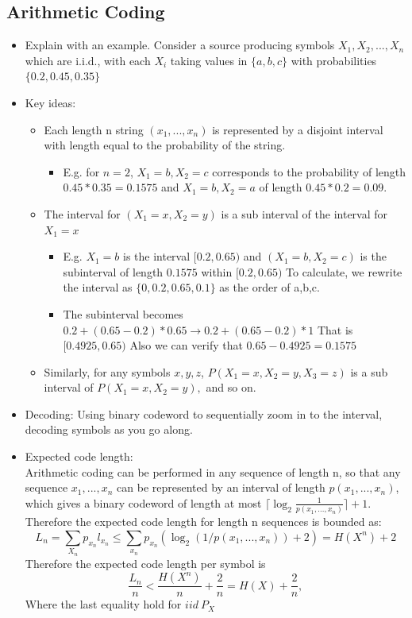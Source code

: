 \documentclass[12pt]{article}
\begin{document}
\subsection{Arithmetic Coding}
\begin{itemize}

\item Explain with an example. Consider a source producing symbols $X_1,X_2,...,X_n$ which are i.i.d., with each $X_i$ taking values in $\{a,b,c\}$ with probabilities $\{0.2,0.45,0.35\}$
\item Key ideas:
\begin{itemize}
\item Each length n string $(x_1,...,x_n)$ is represented by a disjoint interval with length equal to the probability of the string. 
\begin{itemize}
\item E.g. for $n=2$, $X_1=b,X_2=c$ corresponds to the probability of length $0.45 * 0.35=0.1575$ and $X_1=b,X_2=a$ of length $0.45 * 0.2=0.09$.
\end{itemize}
\item The interval for $(X_1=x,X_2=y)$ is a sub interval of the interval for $X_1=x$ 
\begin{itemize}
\item E.g. $X_1 = b$ is the interval $[0.2,0.65)$ and $(X_1 = b, X_2=c)$ is the subinterval of length $0.1575$ within  $[0.2,0.65)$ To calculate, we rewrite the interval as $\{0,0.2,0.65,0.1\}$ as the order of a,b,c.
\item The subinterval becomes $0.2 + (0.65-0.2) * 0.65 \rightarrow 0.2 + (0.65-0.2) * 1$ That is $[0.4925,0.65)$ Also we can verify that $0.65 - 0.4925 = 0.1575$
\end{itemize}  
\item Similarly, for any symbols $x,y,z$, $P(X_1=x,X_2=y,X_3=z)$ is a sub interval of $P(X_1=x,X_2=y),$ and so on.
\end{itemize}
\item Decoding: Using binary codeword to sequentially zoom in to the interval, decoding symbols as you go along.
\item Expected code length:\\
Arithmetic coding can be performed in any sequence of length n, so that any sequence $x_1,...,x_n$ can be represented by an interval of length $p(x_1,...,x_n)$, which gives a binary codeword of length at most $\lceil \log_2\frac{1}{p(x_1,...,x_n)} \rceil + 1$. \\
Therefore the expected code length for length n sequences is bounded as:
\[
L_n = \sum_{X_n} p_{x_n}\mathit{l}_{x_n} \le \sum_{x_n} p_{x_n} (\log_2\left(1/p(x_1,...,x_n)\right)+2) = H(X^n) + 2
\]
Therefore the expected code length per symbol is 
\[
\frac{L_n}{n} < \frac{H(X^n)}{n} + \frac{2}{n} = H(X) + \frac{2}{n},
\]
Where the last equality hold for $iid ~ P_X$
\end{itemize}
\end{document}
